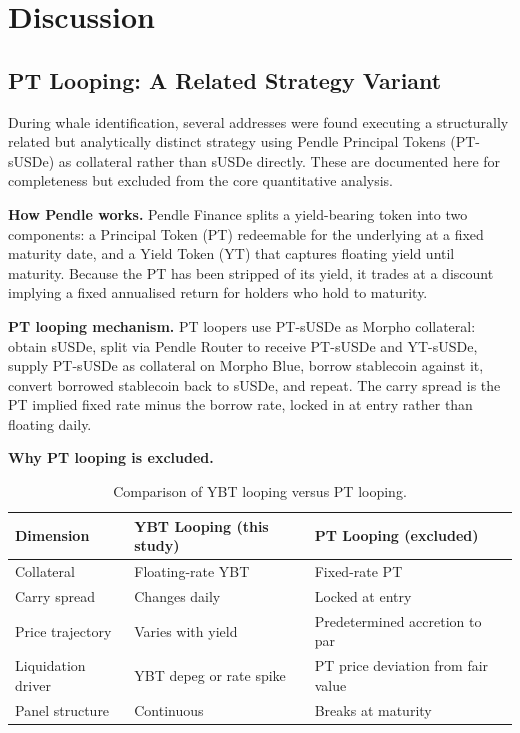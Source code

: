 \section{Discussion}
\label{sec:discussion}


\subsection{PT Looping: A Related Strategy Variant}

During whale identification, several addresses were found executing a structurally related but analytically distinct strategy using Pendle Principal Tokens (PT-sUSDe) as collateral rather than sUSDe directly. These are documented here for completeness but excluded from the core quantitative analysis.

\textbf{How Pendle works.} Pendle Finance splits a yield-bearing token into two components: a Principal Token (PT) redeemable for the underlying at a fixed maturity date, and a Yield Token (YT) that captures floating yield until maturity. Because the PT has been stripped of its yield, it trades at a discount implying a fixed annualised return for holders who hold to maturity.

\textbf{PT looping mechanism.} PT loopers use PT-sUSDe as Morpho collateral: obtain sUSDe, split via Pendle Router to receive PT-sUSDe and YT-sUSDe, supply PT-sUSDe as collateral on Morpho Blue, borrow stablecoin against it, convert borrowed stablecoin back to sUSDe, and repeat. The carry spread is the PT implied fixed rate minus the borrow rate, locked in at entry rather than floating daily.

\textbf{Why PT looping is excluded.}

\begin{table}[h!]
\centering
\caption{Comparison of YBT looping versus PT looping.}
\label{tab:pt-comparison}
\begin{tabular}{lp{4.5cm}p{4.5cm}}
\hline
\textbf{Dimension} & \textbf{YBT Looping (this study)} & \textbf{PT Looping (excluded)} \\
\hline
Collateral & Floating-rate YBT & Fixed-rate PT \\
Carry spread & Changes daily & Locked at entry \\
Price trajectory & Varies with yield & Predetermined accretion to par \\
Liquidation driver & YBT depeg or rate spike & PT price deviation from fair value \\
Panel structure & Continuous & Breaks at maturity \\
\hline
\end{tabular}
\end{table}

